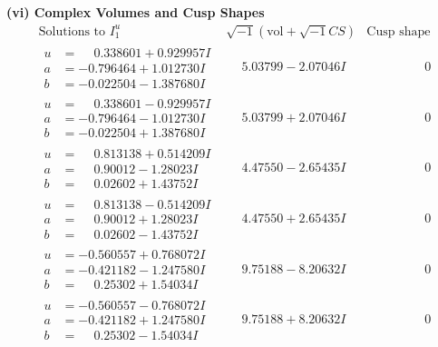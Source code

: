 \documentclass[1p]{elsarticle_modified}
\theoremstyle{definition}
\newcommand{\I}{\sqrt{-1}}
\begin{document}
\newpage\flushleft \textbf{(vi) Complex Volumes and Cusp Shapes}
$$\begin{array}{c|c|c}  
\text{Solutions to }I^u_{1}& \I (\text{vol} + \sqrt{-1}CS) & \text{Cusp shape}\\
 \hline 
\begin{aligned}
u &= \phantom{-}0.338601 + 0.929957 I \\
a &= -0.796464 + 1.012730 I \\
b &= -0.022504 - 1.387680 I\end{aligned}
 & \phantom{-}5.03799 - 2.07046 I & \phantom{-0.000000 } 0 \\ \hline\begin{aligned}
u &= \phantom{-}0.338601 - 0.929957 I \\
a &= -0.796464 - 1.012730 I \\
b &= -0.022504 + 1.387680 I\end{aligned}
 & \phantom{-}5.03799 + 2.07046 I & \phantom{-0.000000 } 0 \\ \hline\begin{aligned}
u &= \phantom{-}0.813138 + 0.514209 I \\
a &= \phantom{-}0.90012 - 1.28023 I \\
b &= \phantom{-}0.02602 + 1.43752 I\end{aligned}
 & \phantom{-}4.47550 - 2.65435 I & \phantom{-0.000000 } 0 \\ \hline\begin{aligned}
u &= \phantom{-}0.813138 - 0.514209 I \\
a &= \phantom{-}0.90012 + 1.28023 I \\
b &= \phantom{-}0.02602 - 1.43752 I\end{aligned}
 & \phantom{-}4.47550 + 2.65435 I & \phantom{-0.000000 } 0 \\ \hline\begin{aligned}
u &= -0.560557 + 0.768072 I \\
a &= -0.421182 - 1.247580 I \\
b &= \phantom{-}0.25302 + 1.54034 I\end{aligned}
 & \phantom{-}9.75188 - 8.20632 I & \phantom{-0.000000 } 0 \\ \hline\begin{aligned}
u &= -0.560557 - 0.768072 I \\
a &= -0.421182 + 1.247580 I \\
b &= \phantom{-}0.25302 - 1.54034 I\end{aligned}
 & \phantom{-}9.75188 + 8.20632 I & \phantom{-0.000000 } 0 \\ \hline\begin{aligned}

\end{aligned}
\end{array}$$
\end{document}
